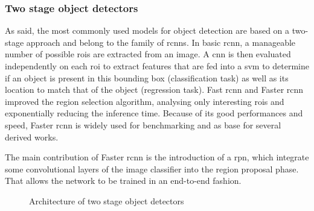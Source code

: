 \documentclass[%
    corpo=12pt,
    twoside,
    stile=classica,   
    tipotesi=magistrale,
    evenboxes,
    english
]{toptesi}
\begin{document}
\subsubsection{Two stage object detectors}
As said, the most commonly used models for object detection are based on a two-stage approach and belong to the family of \glspl{rcnn}. In basic \acrshort{rcnn}\cite{girshick2014rich}, a manageable number of possible \glspl{roi} are extracted from an image. A \gls{cnn} is then evaluated independently on each \acrshort{roi} to extract features that are fed into a \gls{svm}
to determine if an object is present in this bounding box (classification task) as well as its location to match that of the object (regression task).
Fast \acrshort{rcnn}\cite{girshick2015fast} and Faster \acrshort{rcnn}\cite{ren2016faster} improved the region selection algorithm, analysing only interesting \glspl{roi} and exponentially reducing the inference time. Because of its good performances and speed, Faster \acrshort{rcnn} is widely used for benchmarking and as base for several derived works.


The main contribution of Faster \acrshort{rcnn} is the introduction of a \gls{rpn}, which integrate some convolutional layers of the image classifier into the region proposal phase. That allows the network to be trained in an end-to-end fashion.

\begin{figure}[ht]
	\centering
	\caption{Architecture of two stage object detectors}
	\label{fig:architectures}
\end{figure}
\end{document}
